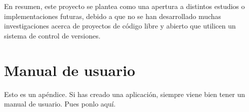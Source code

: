 \documentclass[a4paper, 12pt]{book}
\begin{document}
En resumen, este proyecto se plantea como una apertura a distintos estudios o implementaciones futuras, debido a que no se han desarrollado muchas investigaciones acerca de proyectos de código libre 
y abierto que utilicen un sistema de control de versiones.


\cleardoublepage
\appendix
\chapter{Manual de usuario}
\label{app:manual}

Esto es un apéndice.
Si has creado una aplicación, siempre viene bien tener un manual de usuario.
Pues ponlo aquí.


\cleardoublepage


\end{document}
